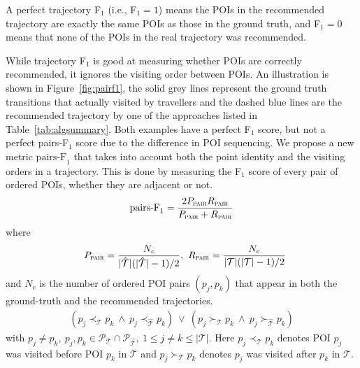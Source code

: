 A perfect trajectory F$_1$ (i.e., F$_1 = 1$) means the POIs in
the recommended trajectory are exactly the same POIs as those in the ground truth,
and F$_1 = 0$ means that none of the POIs in the
real trajectory was recommended.

While trajectory F$_1$ is good at measuring whether POIs are correctly recommended,
it ignores the visiting order between POIs.
An illustration is shown in Figure~\ref{fig:pairf1},
the solid grey lines represent the ground truth transitions that actually visited by travellers
and the dashed blue lines are the recommended trajectory by one of the approaches listed
in Table~\ref{tab:algsummary}. Both examples have a perfect F$_1$ score, but not a perfect
pairs-F$_1$ score due to the difference in POI sequencing.
We propose a new metric $\text{pairs-F}_1$ that takes into account
both the point identity and the visiting orders in a trajectory.
This is done by measuring the F$_1$ score of every pair of ordered POIs, whether they are adjacent or not.
\begin{displaymath}
\text{pairs-F}_1 = \frac{2 P_{\textsc{pair}} R_{\textsc{pair}}}
                       {P_{\textsc{pair}} + R_{\textsc{pair}}}
\end{displaymath}
where
\vspace{-2.0em}
\begin{displaymath}%
~~
P_{\textsc{pair}} = \frac{N_c} {|\hat{\mathcal{T}}|(|\hat{\mathcal{T}}|-1) / 2}, ~
R_{\textsc{pair}} = \frac{N_c} {|\mathcal{T}|(|\mathcal{T}|-1) / 2}
\end{displaymath}
and $N_c$ is the number of ordered POI pairs $(p_j, p_k)$ that
appear in both the ground-truth and the recommended trajectories.
\begin{align*}
    (p_j \prec_{\mathcal{T}} p_k ~\land~ p_j \prec_{\hat{\mathcal{T}}} p_k)  ~\lor~
    (p_j \succ_{\mathcal{T}} p_k ~\land~ p_j \succ_{\hat{\mathcal{T}}} p_k) 
\end{align*}
with $p_j \ne p_k, ~p_j, p_k \in \mathcal{P}_{\mathcal{T}} \cap \mathcal{P}_{\hat{\mathcal{T}}}, ~1 \le j \ne k \le |\mathcal{T}|$.
Here $p_j \prec_{\mathcal{T}} p_k$ denotes POI $p_j$ was visited before POI $p_k$ in $\mathcal{T}$
and $p_j \succ_{\mathcal{T}} p_k$ denotes $p_j$ was visited after $p_k$ in $\mathcal{T}$.

